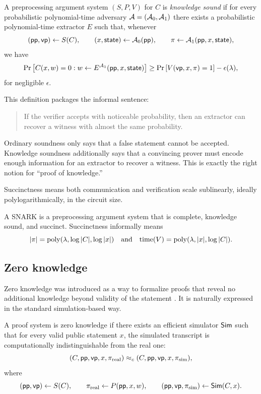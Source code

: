 \begin{definition}
A preprocessing argument system $(S,P,V)$ for $C$ is \emph{knowledge sound} if for every probabilistic polynomial-time adversary $\mathcal{A}=(\mathcal{A}_0,\mathcal{A}_1)$ there exists a probabilistic polynomial-time extractor $E$ such that, whenever
\[
(\mathsf{pp},\mathsf{vp})\leftarrow S(C),\qquad (x,\mathsf{state})\leftarrow \mathcal{A}_0(\mathsf{pp}),\qquad \pi\leftarrow \mathcal{A}_1(\mathsf{pp},x,\mathsf{state}),
\]
we have
\[
\Pr\left[C(x,w)=0: w\leftarrow E^{\mathcal{A}_1}(\mathsf{pp},x,\mathsf{state})\right]
\ge
\Pr\left[V(\mathsf{vp},x,\pi)=1\right]-\epsilon(\lambda),
\]
for negligible $\epsilon$.
\end{definition}

This definition packages the informal sentence:
\begin{quote}
If the verifier accepts with noticeable probability, then an extractor can recover a witness with almost the same probability.
\end{quote}

\begin{remark}
Ordinary soundness only says that a false statement cannot be accepted. Knowledge soundness additionally says that a convincing prover must encode enough information for an extractor to recover a witness. This is exactly the right notion for ``proof of knowledge.''
\end{remark}

Succinctness means both communication and verification scale sublinearly, ideally polylogarithmically, in the circuit size.

\begin{definition}[SNARK]
A SNARK is a preprocessing argument system that is complete, knowledge sound, and succinct. Succinctness informally means
\[
\left|\pi\right|=\mathrm{poly}(\lambda,\log |C|,\log |x|)
\quad\text{and}\quad
\mathrm{time}(V)=\mathrm{poly}(\lambda,|x|,\log |C|).
\]
\end{definition}

\subsection{Zero knowledge}

Zero knowledge was introduced as a way to formalize proofs that reveal no additional knowledge beyond validity of the statement \cite{GoldwasserMicaliRackoff1989}. It is naturally expressed in the standard simulation-based way.

\begin{definition}
A proof system is zero knowledge if there exists an efficient simulator $\mathsf{Sim}$ such that for every valid public statement $x$, the simulated transcript is computationally indistinguishable from the real one:
\[
(C,\mathsf{pp},\mathsf{vp},x,\pi_{\mathrm{real}}) \approx_c (C,\mathsf{pp},\mathsf{vp},x,\pi_{\mathrm{sim}}),
\]
where
\[
(\mathsf{pp},\mathsf{vp})\leftarrow S(C),\qquad \pi_{\mathrm{real}}\leftarrow P(\mathsf{pp},x,w),\qquad (\mathsf{pp},\mathsf{vp},\pi_{\mathrm{sim}})\leftarrow \mathsf{Sim}(C,x).
\]
\end{definition}

